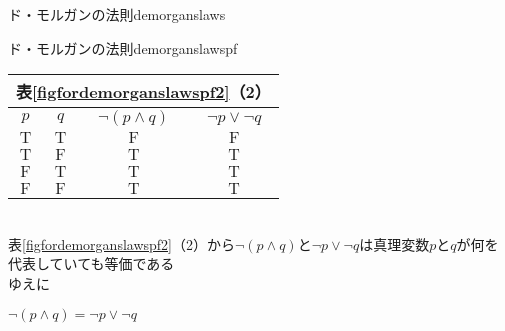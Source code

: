 \documentclass[report]{jlreq}%
\newcounter{myso}
\begin{document}
\begin{mysothm}{ド・モルガンの法則}{demorganslaws}
\begin{mysoproof}{ド・モルガンの法則}{demorganslawspf}
\begin{minipage}[h]{0.45\linewidth}
			\begin{tabular}{|c|c|c|c|}
				\multicolumn{4}{c}{表\ref*{figfordemorganslawspf2}（2）}\\
				\hline
				$p$ & $q$ & $\neg{}(p\land{}q)$ & $\neg{}p\lor{}\neg{}q$ \\
				\hline\hline
				$\mathrm{T}$ & $\mathrm{T}$ & $\mathrm{F}$ & $\mathrm{F}$\\
				\hline
				$\mathrm{T}$ & $\mathrm{F}$ & $\mathrm{T}$ & $\mathrm{T}$\\
				\hline
				$\mathrm{F}$ & $\mathrm{T}$ & $\mathrm{T}$ & $\mathrm{T}$\\
				\hline
				$\mathrm{F}$ & $\mathrm{F}$ & $\mathrm{T}$ & $\mathrm{T}$\\
				\hline
			\end{tabular}
		\end{minipage}
		\\
		表\ref*{figfordemorganslawspf2}（2）から$\neg{}(p\land{}q)$と$\neg{}p\lor{}\neg{}q$は真理変数$p$と$q$が何を代表していても等価である\\
		ゆえに
		\begin{center}
			$\neg{}(p\land{}q)=\neg{}p\lor{}\neg{}q$\\
		\end{center}
	\end{mysoproof}

\end{mysothm}
\end{document}
